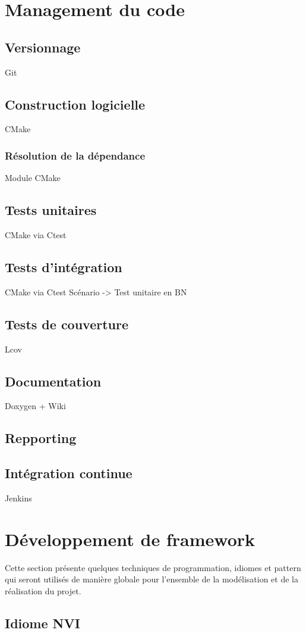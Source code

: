 \section{Management du code}
\subsection{Versionnage}
Git
\subsection{Construction logicielle}
CMake
\subsubsection{Résolution de la dépendance}
Module CMake
\subsection{Tests unitaires}
CMake via Ctest
\subsection{Tests d'intégration}
CMake via Ctest
Scénario -> Test unitaire en BN
\subsection{Tests de couverture}
Lcov
\subsection{Documentation}
Doxygen + Wiki
\subsection{Repporting}
\subsection{Intégration continue}
Jenkins

\section{Développement de framework}
Cette section présente quelques techniques de programmation, idiomes et pattern qui seront utilisés de manière globale pour l'ensemble de la modélisation et de la réalisation du projet.
\subsection{Idiome NVI}

